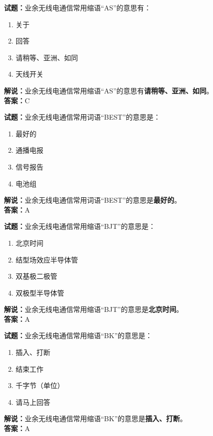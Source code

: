 \documentclass{ctexbook}
\begin{document}
\vspace{1em}

\textbf{试题：}业余无线电通信常用缩语“AS”的意思有：
\begin{enumerate}[leftmargin=3em]
  \item 关于
  \item 回答
  \item 请稍等、亚洲、如同
  \item 天线开关
\end{enumerate}
\noindent\textbf{解说：}业余无线电通信常用缩语“AS”的意思有\textbf{请稍等、亚洲、如同}。\\\noindent\textbf{答案：}C

\vspace{1em}

\textbf{试题：}业余无线电通信常用词语“BEST”的意思是：
\begin{enumerate}[leftmargin=3em]
  \item 最好的
  \item 通播电报
  \item 信号报告
  \item 电池组
\end{enumerate}
\noindent\textbf{解说：}业余无线电通信常用词语“BEST”的意思是\textbf{最好的}。\\\noindent\textbf{答案：}A

\vspace{1em}

\textbf{试题：}业余无线电通信常用缩语“BJT”的意思是：
\begin{enumerate}[leftmargin=3em]
  \item 北京时间
  \item 结型场效应半导体管
  \item 双基极二极管
  \item 双极型半导体管
\end{enumerate}
\noindent\textbf{解说：}业余无线电通信常用缩语“BJT”的意思是\textbf{北京时间}。\\\noindent\textbf{答案：}A

\vspace{1em}

\textbf{试题：}业余无线电通信常用缩语“BK”的意思是：
\begin{enumerate}[leftmargin=3em]
  \item 插入、打断
  \item 结束工作
  \item 千字节（单位）
  \item 请马上回答
\end{enumerate}
\noindent\textbf{解说：}业余无线电通信常用缩语“BK”的意思是\textbf{插入、打断}。\\\noindent\textbf{答案：}A
\end{document}
